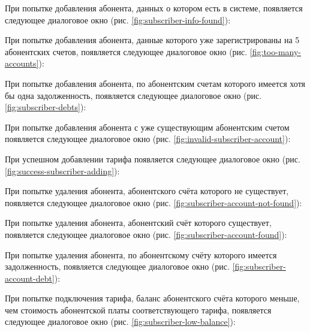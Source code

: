 При попытке добавления абонента, данных о котором есть в системе, появляется следующее диалоговое окно (рис. \ref{fig:subscriber-info-found}):

При попытке добавления абонента, данные которого уже зарегистрированы на 5 абонентских счетов, появляется следующее диалоговое окно (рис. \ref{fig:too-many-accounts}):

При попытке добавления абонента, по абонентским счетам которого имеется хотя бы одна задолженность, появляется следующее диалоговое окно (рис. \ref{fig:subscriber-debts}):

При попытке добавления абонента с уже существующим абонентским счетом появляется следующее диалоговое окно (рис. \ref{fig:invalid-subscriber-account}):

При успешном добавлении тарифа появляется следующее диалоговое окно (рис. \ref{fig:success-subscriber-adding}):

При попытке удаления абонента, абонентского счёта которого не существует, появляется следующее диалоговое окно (рис. \ref{fig:subscriber-account-not-found}):

При попытке удаления абонента, абонентский счёт которого существует, появляется следующее диалоговое окно (рис. \ref{fig:subscriber-account-found}):

При попытке удаления абонента, по абонентскому счёту которого имеется задолженность, появляется следующее диалоговое окно (рис. \ref{fig:subscriber-account-debt}):

При попытке подключения тарифа, баланс абонентского счёта которого меньше, чем стоимость абонентской платы соответствующего тарифа, появляется следующее диалоговое окно (рис. \ref{fig:subscriber-low-balance}):

